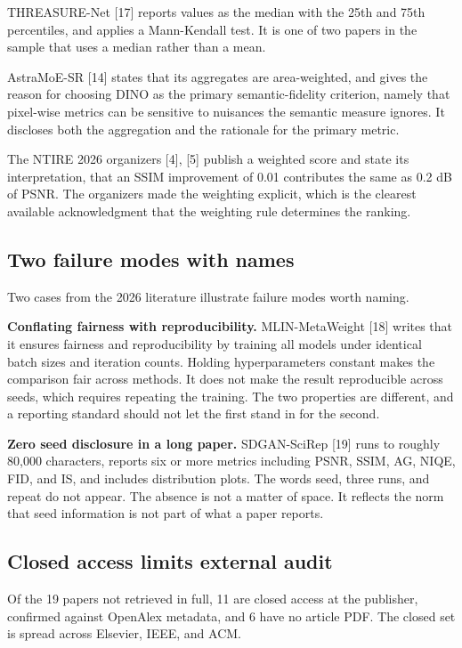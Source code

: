 \documentclass[journal,twoside,10pt]{IEEEtran}
\begin{document}
THREASURE-Net [17] reports values as the median with the 25th and 75th percentiles, and applies a Mann-Kendall test. It is one of two papers in the sample that uses a median rather than a mean.

AstraMoE-SR [14] states that its aggregates are area-weighted, and gives the reason for choosing DINO as the primary semantic-fidelity criterion, namely that pixel-wise metrics can be sensitive to nuisances the semantic measure ignores. It discloses both the aggregation and the rationale for the primary metric.

The NTIRE 2026 organizers [4], [5] publish a weighted score and state its interpretation, that an SSIM improvement of 0.01 contributes the same as 0.2 dB of PSNR. The organizers made the weighting explicit, which is the clearest available acknowledgment that the weighting rule determines the ranking.

\subsection{Two failure modes with names}


Two cases from the 2026 literature illustrate failure modes worth naming.

\textbf{Conflating fairness with reproducibility.} MLIN-MetaWeight [18] writes that it ensures fairness and reproducibility by training all models under identical batch sizes and iteration counts. Holding hyperparameters constant makes the comparison fair across methods. It does not make the result reproducible across seeds, which requires repeating the training. The two properties are different, and a reporting standard should not let the first stand in for the second.

\textbf{Zero seed disclosure in a long paper.} SDGAN-SciRep [19] runs to roughly 80,000 characters, reports six or more metrics including PSNR, SSIM, AG, NIQE, FID, and IS, and includes distribution plots. The words seed, three runs, and repeat do not appear. The absence is not a matter of space. It reflects the norm that seed information is not part of what a paper reports.

\subsection{Closed access limits external audit}


Of the 19 papers not retrieved in full, 11 are closed access at the publisher, confirmed against OpenAlex metadata, and 6 have no article PDF. The closed set is spread across Elsevier, IEEE, and ACM.
\end{document}
